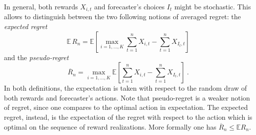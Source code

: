 \documentclass[11pt]{hackednow}
\newcommand{\E}{\mathbb{E}}
\newcommand{\oR}{\overline{R}}
\begin{document}
In general, both rewards $X_{i,t}$ and forecaster's choices $I_t$ might be stochastic. This allows to distinguish between the two following notions of averaged regret: the \textsl{expected regret}
\begin{equation} \label{eq:exp-regret}
    \E\,R_n = \E\left[\max_{i=1,\hdots,K} \sum_{t=1}^n X_{i,t} - \sum_{t=1}^n X_{I_t,t}\right]
\end{equation}
and the \textsl{pseudo-regret}
%
\begin{equation} \label{eq:pseudoregret}
\overline{R}_n = \max_{i=1,\dots,K} \E\left[ \sum_{t=1}^n X_{i,t} - \sum_{t=1}^n X_{I_t,t}\right]~.
\end{equation}
%
In both definitions, the expectation is taken with respect to the random draw of both rewards and forecaster's actions. Note that pseudo-regret is a weaker notion of regret, since one compares to the optimal action in expectation. The expected regret, instead, is the expectation of the regret with respect to the action which is optimal on the sequence of reward realizations. More formally one has $\oR_n \leq \E R_n$. 
\end{document}

